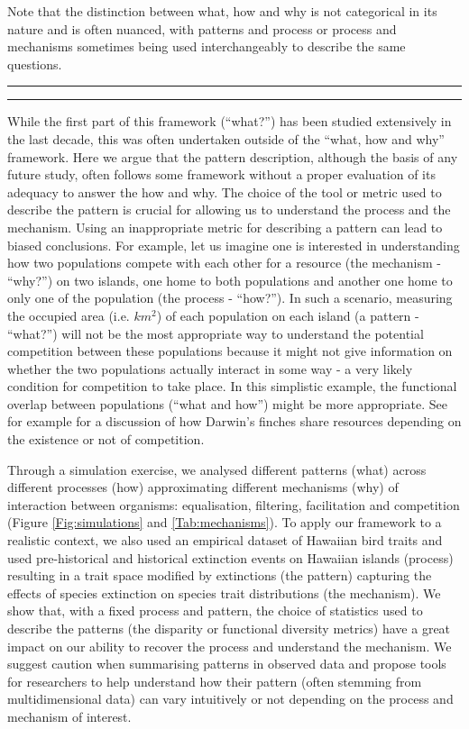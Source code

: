 \documentclass[12pt,letterpaper]{article}
\begin{document}
Note that the distinction between what, how and why is not categorical in its nature and is often nuanced, with patterns and process or process and mechanisms sometimes being used interchangeably to describe the same questions.

\bigskip
\hrule
\hrule
\bigskip

While the first part of this framework (``what?'') has been studied extensively in the last decade, this was often undertaken outside of the ``what, how and why'' framework.
Here we argue that the pattern description, although the basis of any future study, often follows some framework without a proper evaluation of its adequacy to answer the how and why.
The choice of the tool or metric used to describe the pattern is crucial for allowing us to understand the process and the mechanism.
Using an inappropriate metric for describing a pattern can lead to biased conclusions.
For example, let us imagine one is interested in understanding how two populations compete with each other for a resource (the mechanism - ``why?'') on two islands, one home to both populations and another one home to only one of the population (the process - ``how?'').
In such a scenario, measuring the occupied area (i.e. $km^{2}$) of each population on each island (a pattern - ``what?'') will not be the most appropriate way to understand the potential competition between these populations because it might not give information on whether the two populations actually interact in some way - a very likely condition for competition to take place.
In this simplistic example, the functional overlap between populations (``what and how'') might be more appropriate.
See for example \citealt{carvalho2020decomposing} for a discussion of how Darwin's finches share resources depending on the existence or not of competition.

Through a simulation exercise, we analysed different patterns (what) across different processes (how) approximating different mechanisms (why) of interaction between organisms: equalisation, filtering, facilitation and competition (Figure \ref{Fig:simulations} and \ref{Tab:mechanisms}).
To apply our framework to a realistic context, we also used an empirical dataset of Hawaiian bird traits and used pre-historical and historical extinction events on Hawaiian islands (process) resulting in a trait space modified by extinctions (the pattern) capturing the effects of species extinction on species trait distributions (the mechanism).
We show that, with a fixed process and pattern, the choice of statistics used to describe the patterns (the disparity or functional diversity metrics) have a great impact on our ability to recover the process and understand the mechanism.
We suggest caution when summarising patterns in observed data and propose tools for researchers to help understand how their pattern (often stemming from multidimensional data) can vary intuitively or not depending on the process and mechanism of interest.
\end{document}
